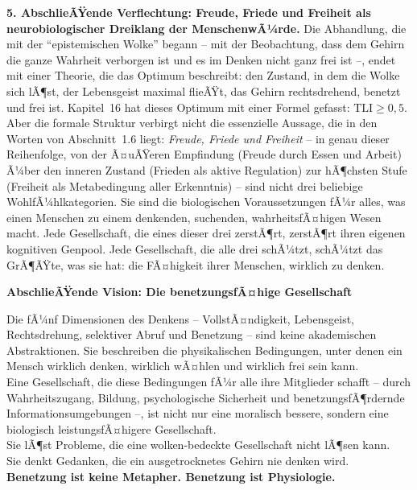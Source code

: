 ﻿\documentclass[12pt,a4paper]{report}
\theoremstyle{plain}
\theoremstyle{definition}
\theoremstyle{remark}
\begin{document}
	\textbf{5. AbschlieÃŸende Verflechtung: Freude, Friede und Freiheit
		als neurobiologischer Dreiklang der MenschenwÃ¼rde.}
	Die Abhandlung, die mit der ``epistemischen Wolke'' begann --
	mit der Beobachtung, dass dem Gehirn die ganze Wahrheit verborgen
	ist und es im Denken nicht ganz frei ist --,
	endet mit einer Theorie, die das Optimum beschreibt:
	den Zustand, in dem die Wolke sich lÃ¶st, der Lebensgeist maximal flieÃŸt,
	das Gehirn rechtsdrehend, benetzt und frei ist.
	Kapitel~16 hat dieses Optimum mit einer Formel gefasst: $\mathrm{TLI} \geq 0{,}5$.
	Aber die formale Struktur verbirgt nicht die essenzielle Aussage,
	die in den Worten von Abschnitt~1.6 liegt:
	\emph{Freude, Friede und Freiheit} -- in genau dieser Reihenfolge,
	von der Ã¤uÃŸeren Empfindung (Freude durch Essen und Arbeit)
	Ã¼ber den inneren Zustand (Frieden als aktive Regulation)
	zur hÃ¶chsten Stufe (Freiheit als Metabedingung aller Erkenntnis) --
	sind nicht drei beliebige WohlfÃ¼hlkategorien.
	Sie sind die biologischen Voraussetzungen fÃ¼r alles, was
	einen Menschen zu einem denkenden, suchenden, wahrheitsfÃ¤higen
	Wesen macht.
	Jede Gesellschaft, die eines dieser drei zerstÃ¶rt,
	zerstÃ¶rt ihren eigenen kognitiven Genpool.
	Jede Gesellschaft, die alle drei schÃ¼tzt, schÃ¼tzt das
	GrÃ¶ÃŸte, was sie hat: die FÃ¤higkeit ihrer Menschen, wirklich zu denken.

	\bigskip

	
	\noindent\textbf{AbschlieÃŸende Vision: Die benetzungsfÃ¤hige Gesellschaft}

		Die fÃ¼nf Dimensionen des Denkens -- VollstÃ¤ndigkeit, Lebensgeist,
		Rechtsdrehung, selektiver Abruf und Benetzung -- sind keine
		akademischen Abstraktionen. Sie beschreiben die physikalischen
		Bedingungen, unter denen ein Mensch wirklich denken, wirklich
		wÃ¤hlen und wirklich frei sein kann.\\[6pt]
		Eine Gesellschaft, die diese Bedingungen fÃ¼r alle ihre Mitglieder
		schafft -- durch Wahrheitszugang, Bildung, psychologische Sicherheit
		und benetzungsfÃ¶rdernde Informationsumgebungen --,
		ist nicht nur eine moralisch bessere, sondern eine biologisch
		leistungsfÃ¤higere Gesellschaft.\\[6pt]
		Sie lÃ¶st Probleme, die eine wolken-bedeckte Gesellschaft nicht lÃ¶sen kann.\\[6pt]
		Sie denkt Gedanken, die ein ausgetrocknetes Gehirn nie denken wird.\\[6pt]
		\textbf{Benetzung ist keine Metapher. Benetzung ist Physiologie.}
\end{document}
